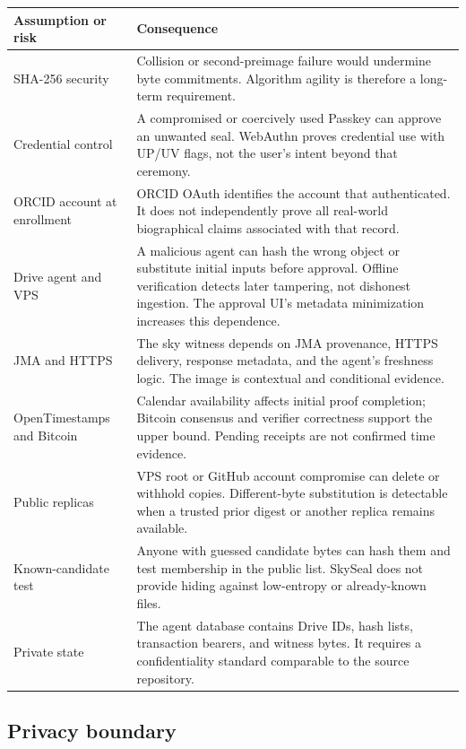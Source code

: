 \documentclass[11pt,a4paper]{article}
\begin{document}
\begin{longtable}{>{\raggedright\arraybackslash}p{}>{\raggedright\arraybackslash}p{}}
\toprule
Assumption or risk & Consequence \\
\midrule
\endhead
SHA-256 security & Collision or second-preimage failure would undermine byte commitments. Algorithm agility is therefore a long-term requirement. \\
Credential control & A compromised or coercively used Passkey can approve an unwanted seal. WebAuthn proves credential use with UP/UV flags, not the user's intent beyond that ceremony. \\
ORCID account at enrollment & ORCID OAuth identifies the account that authenticated. It does not independently prove all real-world biographical claims associated with that record. \\
Drive agent and VPS & A malicious agent can hash the wrong object or substitute initial inputs before approval. Offline verification detects later tampering, not dishonest ingestion. The approval UI's metadata minimization increases this dependence. \\
JMA and HTTPS & The sky witness depends on JMA provenance, HTTPS delivery, response metadata, and the agent's freshness logic. The image is contextual and conditional evidence. \\
OpenTimestamps and Bitcoin & Calendar availability affects initial proof completion; Bitcoin consensus and verifier correctness support the upper bound. Pending receipts are not confirmed time evidence. \\
Public replicas & VPS root or GitHub account compromise can delete or withhold copies. Different-byte substitution is detectable when a trusted prior digest or another replica remains available. \\
Known-candidate test & Anyone with guessed candidate bytes can hash them and test membership in the public list. SkySeal does not provide hiding against low-entropy or already-known files. \\
Private state & The agent database contains Drive IDs, hash lists, transaction bearers, and witness bytes. It requires a confidentiality standard comparable to the source repository. \\
\bottomrule
\end{longtable}

\subsection{Privacy boundary}
\end{document}
